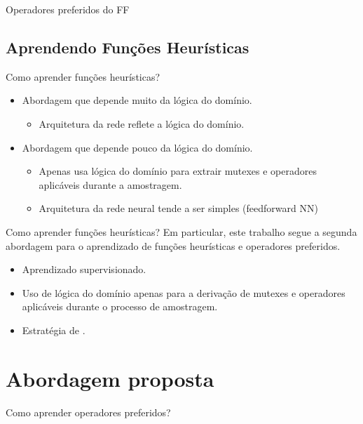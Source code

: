 \documentclass{beamer}
\begin{document}
\begin{frame}{Operadores preferidos do FF}
\end{frame}

\subsection{Aprendendo Funções Heurísticas}
\begin{frame}{Como aprender funções heurísticas?}
\begin{itemize}
  \item Abordagem que depende \alert{muito} da lógica do domínio.
    \begin{itemize}
      \item Arquitetura da rede reflete a lógica do domínio.
    \end{itemize}
  \pause
  \item Abordagem que depende \alert{pouco} da lógica do domínio.
    \begin{itemize}
      \item Apenas usa lógica do domínio para extrair mutexes e operadores aplicáveis durante a amostragem.
      \item Arquitetura da rede neural tende a ser simples (feedforward NN)
    \end{itemize}
\end{itemize}
\end{frame}

\begin{frame}{Como aprender funções heurísticas?}
Em particular, este trabalho segue a segunda abordagem para o aprendizado de funções heurísticas e operadores preferidos.
\begin{itemize}
  \item Aprendizado supervisionado.
  \item Uso de lógica do domínio apenas para a derivação de mutexes e operadores aplicáveis durante o processo de amostragem.
  \item Estratégia de \cite{Bettker.etal/2022}.
\end{itemize}
\end{frame}


\section{Abordagem proposta}
\begin{frame}{Como aprender operadores preferidos?}

\end{frame}
\end{document}
